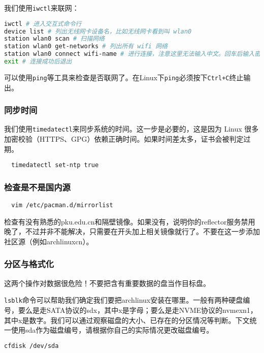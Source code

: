 \documentclass[../main.tex]{subfiles}
\begin{document}
我们使用\texttt{iwctl}来联网：

\begin{lstlisting}[language=bash]
iwctl # 进入交互式命令行
device list # 列出无线网卡设备名，比如无线网卡看到叫 wlan0
station wlan0 scan # 扫描网络
station wlan0 get-networks # 列出所有 wifi 网络
station wlan0 connect wifi-name # 进行连接，注意这里无法输入中文。回车后输入密码即可
exit # 连接成功后退出
\end{lstlisting}

可以使用\texttt{ping}等工具来检查是否联网了。在Linux下\texttt{ping}必须按下\texttt{Ctrl+C}终止输出。

\subsubsection{同步时间}

我们使用\texttt{timedatectl}来同步系统的时间。这一步是必要的，这是因为 Linux 很多加密校验（HTTPS、GPG）依赖正确时间。如果时间差太多，证书会被判定过期。

\begin{lstlisting}
  timedatectl set-ntp true
\end{lstlisting}

\subsubsection{检查是不是国内源}

\begin{lstlisting}
  vim /etc/pacman.d/mirrorlist
\end{lstlisting}

检查有没有熟悉的pku.edu.cn和隔壁镜像。如果没有，说明你的reflector服务禁用晚了，不过并非不能解决，只需要在开头加上相关镜像就行了。不要在这一步添加社区源（例如archlinuxcn）。

\subsubsection{分区与格式化}

这两个操作对数据很危险！不要把含有重要数据的盘当作目标盘。

\texttt{lsblk}命令可以帮助我们确定我们要把archlinux安装在哪里。一般有两种硬盘编号，要么是走SATA协议的sdx，其中x是字母；要么是走NVME协议的nvmexn1，其中x是数字。我们可以通过观察磁盘的大小、已存在的分区情况等判断。下文统一使用sda作为磁盘编号，请根据你自己的实际情况更改磁盘编号。

\begin{lstlisting}[language=bash]
  cfdisk /dev/sda
\end{lstlisting}
\end{document}
